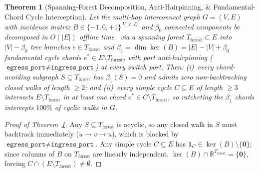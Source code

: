 \documentclass[10pt,twocolumn]{article}
\theoremstyle{spectralthm}
\newtheorem{theorem}{Theorem}[section]
\begin{document}
\begin{theorem}[Spanning-Forest Decomposition, Anti-Hairpinning, \& Fundamental-Chord Cycle Interception]
\label{thm:forest}
Let the multi-hop interconnect graph $G = (V, E)$ with incidence matrix $B \in \{-1, 0, +1\}^{|V| \times |E|}$ and $\beta_0$ connected components be decomposed in $O(|E|)$ offline time~\cite{tarjan1983data} via a spanning forest $T_{\mathrm{forest}} \subset E$ into $|V| - \beta_0$ tree branches $e \in T_{\mathrm{forest}}$ and $\beta_1 = \dim \ker(B) = |E| - |V| + \beta_0$ fundamental cycle chords $e^* \in E \setminus T_{\mathrm{forest}}$, with port anti-hairpinning ($\texttt{egress\_port} \neq \texttt{ingress\_port}$) at every switch port. Then: (i)~every chord-avoiding subgraph $S \subseteq T_{\mathrm{forest}}$ has $\beta_1(S) = 0$ and admits zero non-backtracking closed walks of length $\ge 2$; and (ii)~every simple cycle $C \subseteq E$ of length $\ge 3$ intersects $E \setminus T_{\mathrm{forest}}$ in at least one chord $e^* \in C \setminus T_{\mathrm{forest}}$, so ratcheting the $\beta_1$ chords intercepts $100\%$ of cyclic walks in $G$.
\end{theorem}
\begin{proof}[Proof of Theorem~\ref{thm:forest}]
Any $S \subseteq T_{\mathrm{forest}}$ is acyclic, so any closed walk in $S$ must backtrack immediately ($u \rightarrow v \rightarrow u$), which is blocked by $\texttt{egress\_port} \neq \texttt{ingress\_port}$. Any simple cycle $C \subseteq E$ has $\mathbf{1}_C \in \ker(B) \setminus \{\mathbf{0}\}$; since columns of $B$ on $T_{\mathrm{forest}}$ are linearly independent, $\ker(B) \cap \mathbb{R}^{T_{\mathrm{forest}}} = \{\mathbf{0}\}$, forcing $C \cap (E \setminus T_{\mathrm{forest}}) \neq \emptyset$.
\end{proof}
\end{document}
